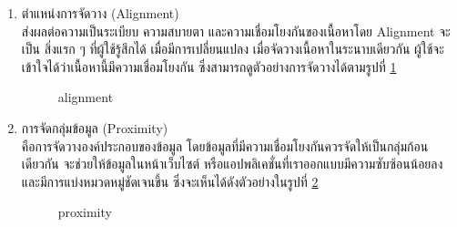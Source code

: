 \documentclass[14pt,oneside,openright,a4paper]{cpe-thai-project}
\begin{document}
\begin{enumerate}
    \newpage

    \item ตำแหน่งการจัดวาง (Alignment)\\
    ส่งผลต่อความเป็นระเบียบ ความสบายตา และความเชื่อมโยงกันของเนื้อหาโดย Alignment จะเป็น สิ่งแรก ๆ ที่ผู้ใช้รู้สึกได้ เมื่อมีการเปลี่ยนแปลง เมื่อจัดวางเนื้อหาในระนาบเดียวกัน ผู้ใช้จะเข้าใจได้ว่าเนื้อหานี้มีความเชื่อมโยงกัน ซึ่งสามารถดูตัวอย่างการจัดวางได้ตามรูปที่ \ref{fig:alignment}
    
    \begin{figure}[!h]\centering
      \setlength{\fboxrule}{0.5mm} %
      \setlength{\fboxsep}{0.5cm}
      \caption{alignment \cite{Alignment}}\label{fig:alignment}
    \end{figure}

    \item การจัดกลุ่มข้อมูล (Proximity) \\
    คือการจัดวางองค์ประกอบของข้อมูล โดยข้อมูลที่มีความเชื่อมโยงกันควรจัดให้เป็นกลุ่มก้อนเดียวกัน จะช่วยให้ข้อมูลในหน้าเว็บไซต์ หรือแอปพลิเคชั่นที่เราออกแบบมีความซับซ้อนน้อยลง และมีการแบ่งหมวดหมู่ชัดเจนขึ้น ซึ่งจะเห็นได้ดังตัวอย่างในรูปที่ \ref{fig:proximity}
    
    \begin{figure}[!h]\centering
      \setlength{\fboxrule}{0.5mm} %
      \setlength{\fboxsep}{0.5cm}
      \caption{proximity \cite{Proximity}}\label{fig:proximity}
    \end{figure}
  \end{enumerate}
\end{document}
